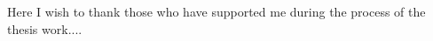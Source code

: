 
\begin{acknowledgements}

Here I wish to thank those who have supported me during the process of the thesis work.... 
\end{acknowledgements}


